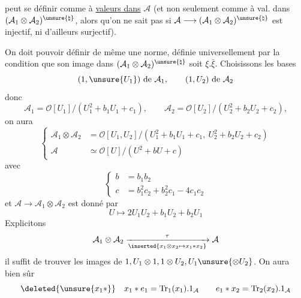 peut se définir comme à \uline{valeurs dans} $\mathcal A$ (et non seulement comme à val. dans $(\mathcal A_1\otimes\mathcal A_2)^{\unsure{\natural}}$, alors qu'on ne sait pas si $\mathcal A\longrightarrow(\mathcal A_1\otimes\mathcal A_2)^{\unsure{\natural}}$ est  injectif, ni d'ailleurs surjectif).

On doit pouvoir définir de même une norme, définie universellement par la condition que son image dans $(\mathcal A_1\otimes\mathcal A_2)^{\unsure{\natural}}$ soit $\xi.\bar\xi$.
Choisissons les bases
\[
(1,\unsure{U_1})\text{ de }\mathcal A_1,\qquad (1,U_2)\text{ de }\mathcal A_2
\]
donc
\[
\mathcal A_1=\mathcal O[U_1]/(U_1^2+b_1U_1+c_1),\qquad
\mathcal A_2=\mathcal O[U_2]/(U_2^2+b_2U_2+c_2),
\]
on aura
\[
\left\{\begin{aligned}
\mathcal A_1\otimes\mathcal A_2&=\mathcal O[U_1,U_2]/(U_1^2+b_1U_1+c_1,\ U_2^2+b_2U_2+c_2)\\
\mathcal A&\simeq\mathcal O[U]/(U^2+bU+c)
\end{aligned}\right.
\]
avec
\[
\left\{\begin{aligned}
b&=b_1b_2\\
c&=b_1^2c_2+b_2^2c_1-4c_1c_2
\end{aligned}\right.
\]
et $\mathcal A\longrightarrow\mathcal A_1\otimes\mathcal A_2$ est donné par
\[
U\longmapsto2U_1U_2+b_1U_2+b_2U_1
\]
Explicitons
\[
\mathcal A_1\otimes\mathcal A_2\xrightarrow[\inserted{x_1\otimes x_2\mapsto x_1*x_2}]{\tau}\mathcal A
\]
il suffit de trouver les images de $1,U_1\otimes1,1\otimes U_2,U_1\unsure{\otimes U_2}$.
On aura bien sûr
\[
\deleted{\unsure{x_1*}}\quad x_1*e_1=\operatorname{Tr}_1(x_1).1_{\mathcal A}
\qquad e_1*x_2=\operatorname{Tr}_2(x_2).1_{\mathcal A}
\]
